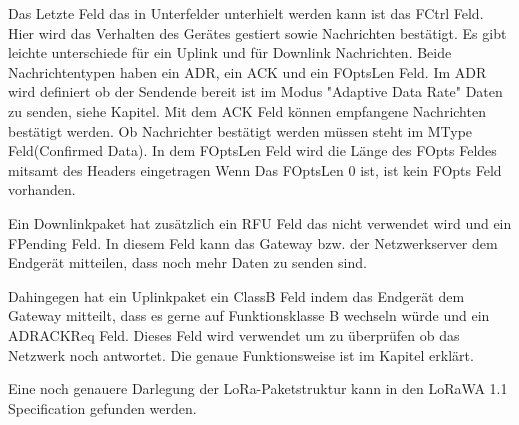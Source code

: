 \documentclass[a4paper,12pt]{article}
\begin{document}
                Das Letzte Feld das in Unterfelder unterhielt werden kann ist das FCtrl Feld. Hier wird das Verhalten des 
                Gerätes gestiert sowie Nachrichten bestätigt. Es gibt leichte unterschiede für ein Uplink und für Downlink 
                Nachrichten. Beide Nachrichtentypen haben ein ADR, ein ACK und ein FOptsLen Feld. Im ADR wird definiert 
                ob der Sendende bereit ist im Modus "Adaptive Data Rate" Daten zu senden, siehe Kapitel. 
                Mit dem ACK Feld können empfangene Nachrichten bestätigt werden. Ob Nachrichter bestätigt werden müssen 
                steht im MType Feld(Confirmed Data). In dem FOptsLen Feld wird die Länge des FOpts Feldes mitsamt des 
                Headers eingetragen Wenn Das FOptsLen 0 ist, ist kein FOpts Feld vorhanden.

                Ein Downlinkpaket hat zusätzlich ein RFU Feld das nicht verwendet wird und ein FPending Feld. In diesem 
                Feld kann das Gateway bzw. der Netzwerkserver dem Endgerät mitteilen, dass noch mehr Daten zu senden sind.

                Dahingegen hat ein Uplinkpaket ein ClassB Feld indem das Endgerät dem Gateway mitteilt, dass es gerne auf 
                Funktionsklasse B wechseln würde und ein ADRACKReq Feld. Dieses Feld wird verwendet um zu überprüfen ob 
                das Netzwerk noch antwortet. Die genaue Funktionsweise ist im Kapitel  erklärt.

                Eine noch genauere Darlegung der LoRa-Paketstruktur kann in den LoRaWA 1.1 Specification \cite{LoRaSpec} 
                gefunden werden.

                
                
\end{document}
